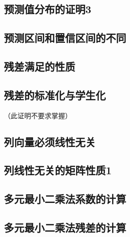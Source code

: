 \documentclass{MGLSA-cn-book-math}
\begin{document}
\subsection{预测值分布的证明3}
\label{proof23}

\subsection{预测区间和置信区间的不同}
\label{proof24}

\subsection{残差满足的性质}
\label{proof25}

\subsection{残差的标准化与学生化}
\label{proof26}
（此证明不要求掌握）

\subsection{列向量必须线性无关}
\label{proof27}

\subsection{列线性无关的矩阵性质1}
\label{proof28}

\subsection{多元最小二乘法系数的计算}
\label{proof29}

\subsection{多元最小二乘法残差的计算}
\label{proof30}
\end{document}
